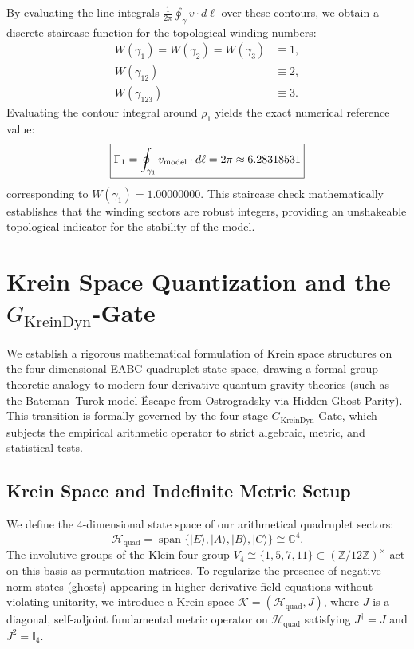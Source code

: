 \documentclass[11pt,a4paper]{article}
\theoremstyle{definition}
\begin{document}
	By evaluating the line integrals $\frac{1}{2\pi}\oint_{\gamma} v \cdot d\ell$ over these contours, we obtain a discrete staircase function for the topological winding numbers:
	\begin{align}
		W(\gamma_1) = W(\gamma_2) = W(\gamma_3) &\equiv 1, \nonumber \\
		W(\gamma_{12}) &\equiv 2, \nonumber \\
		W(\gamma_{123}) &\equiv 3.
	\end{align}
	Evaluating the contour integral around $\rho_1$ yields the exact numerical reference value:
	\begin{equation}
		\boxed{ \Gamma_1 = \oint_{\gamma_1} v_{\rm model} \cdot d\ell = 2\pi \approx 6.28318531 }
	\end{equation}
	corresponding to $W(\gamma_1) = 1.00000000$. This staircase check mathematically establishes that the winding sectors are robust integers, providing an unshakeable topological indicator for the stability of the model.
	
	
	\section{Krein Space Quantization and the $G_{\mathrm{KreinDyn}}$-Gate}
	\label{sec:krein_v4_gate_audit}
	
	We establish a rigorous mathematical formulation of Krein space structures on the four-dimensional EABC quadruplet state space, drawing a formal group-theoretic analogy to modern four-derivative quantum gravity theories (such as the Bateman--Turok model \"Escape from Ostrogradsky via Hidden Ghost Parity\"). This transition is formally governed by the four-stage $G_{\mathrm{KreinDyn}}$-Gate, which subjects the empirical arithmetic operator to strict algebraic, metric, and statistical tests.
	
	\subsection{Krein Space and Indefinite Metric Setup}
	We define the 4-dimensional state space of our arithmetical quadruplet sectors:
	\begin{equation}
		\mathcal{H}_{\mathrm{quad}} = \operatorname{span}\{\vert E\rangle, \vert A\rangle, \vert B\rangle, \vert C\rangle\} \cong \mathbb{C}^4.
	\end{equation}
	The involutive groups of the Klein four-group $V_4 \cong \{1, 5, 7, 11\} \subset (\mathbb{Z}/12\mathbb{Z})^\times$ act on this basis as permutation matrices. 
	To regularize the presence of negative-norm states (ghosts) appearing in higher-derivative field equations without violating unitarity, we introduce a Krein space $\mathcal{K} = (\mathcal{H}_{\mathrm{quad}}, J)$, where $J$ is a diagonal, self-adjoint fundamental metric operator on $\mathcal{H}_{\mathrm{quad}}$ satisfying $J^\dagger = J$ and $J^2 = \mathbb{I}_4$. 
	
\end{document}
